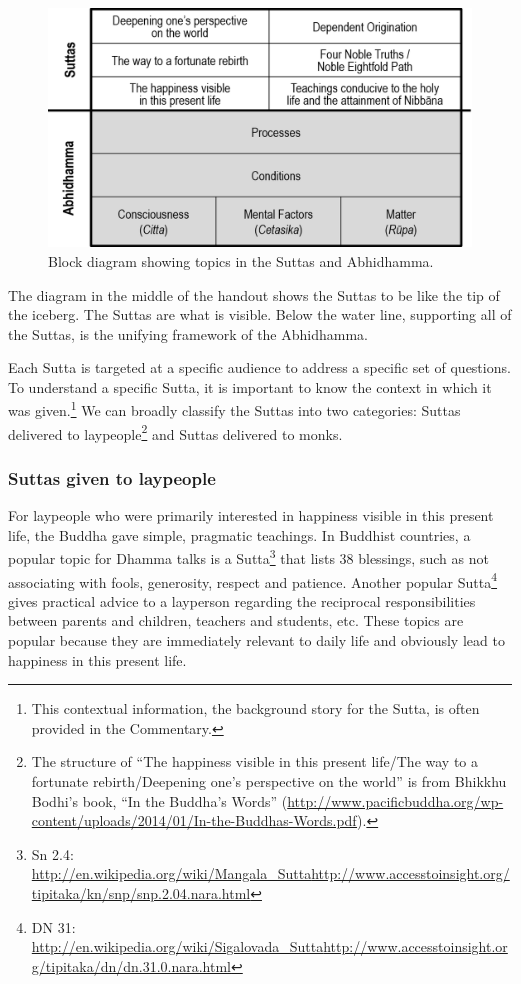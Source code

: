 \pagebreak

\begin{figure}[h]
\centering
\includegraphics[width=0.6\linewidth]{./Diagrams/Block}
\caption{Block diagram showing topics in the Suttas and Abhidhamma.}
\label{fig:Block}
\end{figure}

The diagram in the middle of the handout shows the Suttas to be like the tip of the iceberg. The Suttas are what is visible. Below the water line, supporting all of the Suttas, is the unifying framework of the Abhidhamma.

Each Sutta is targeted at a specific audience to address a specific set of questions. To understand a specific Sutta, it is important to know the context in which it was given.\footnote{This contextual information, the background story for the Sutta, is often provided in the Commentary.} We can broadly classify the Suttas into two categories: Suttas delivered to laypeople\footnote{The structure of “The happiness visible in this present life/The way to a fortunate rebirth/Deepening one’s perspective on the world” is from Bhikkhu Bodhi’s book, “In the Buddha’s Words” (\url{http://www.pacificbuddha.org/wp-content/uploads/2014/01/In-the-Buddhas-Words.pdf}).} and Suttas delivered to monks.

\subsubsection*{Suttas given to laypeople}

For laypeople who were primarily interested in happiness visible in this present life, the Buddha gave simple, pragmatic teachings. In Buddhist countries, a popular topic for Dhamma talks is a Sutta\footnote{Sn 2.4: \url{http://en.wikipedia.org/wiki/Mangala_Sutta}\newline \url{http://www.accesstoinsight.org/tipitaka/kn/snp/snp.2.04.nara.html}} that lists 38 blessings, such as not associating with fools, generosity, respect and patience. Another popular Sutta\footnote{DN 31: \url{http://en.wikipedia.org/wiki/Sigalovada_Sutta}\newline \url{http://www.accesstoinsight.org/tipitaka/dn/dn.31.0.nara.html}} gives practical advice to a layperson regarding the reciprocal responsibilities between parents and children, teachers and students, etc. These topics are popular because they are immediately relevant to daily life and obviously lead to happiness in this present life.


